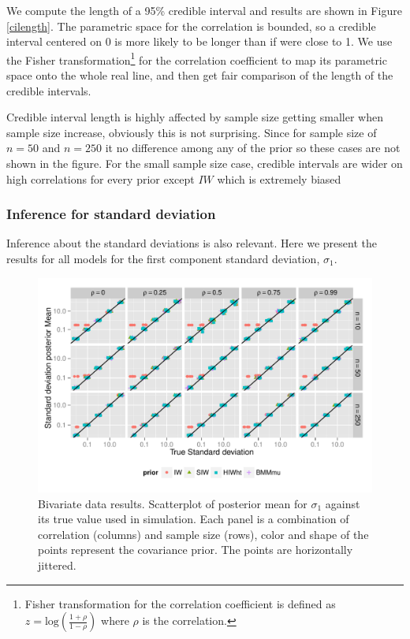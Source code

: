 \documentclass[a4paper]{article}
\newcommand{\matt}[1]{\textcolor{red}{(matt: #1)}}
\begin{document}
We compute the length of a 95\% credible interval and results are shown in Figure \ref{cilength}. The parametric space for the correlation is bounded, so a credible interval centered on 0 is more likely to be longer than if were close to 1. We use the Fisher transformation\footnote{ Fisher transformation for the correlation coefficient is defined as $z = \mbox{log} \left( \frac{1 + \rho}{1 - \rho} \right)$ where $\rho$ is the correlation. } for the correlation coefficient to map its parametric space onto the whole real line, and then get fair comparison of the length of the credible intervals.

Credible interval length is highly affected by sample size getting smaller when sample size increase, obviously this is not surprising.  Since for sample size of $n=50$ and $n=250$ it no difference among any of the prior so these cases are not shown in the figure. For the small sample size case, credible intervals are wider on high correlations for every prior except $IW$ which is extremely biased

\subsubsection{Inference for standard deviation}
Inference about the standard deviations is also relevant. Here we present the results for all models for the first component standard deviation, $\sigma_1$. 
\begin{figure}[htbp]
   \centering
   \includegraphics[width=\textwidth]{fig_s1_d2} 
    \vspace{-.5in}
   \caption{Bivariate data results. Scatterplot of posterior mean for $\sigma_1$  against its true value used in simulation. Each panel is a combination of correlation (columns) and sample size (rows),  color and shape of the points represent the covariance prior. The points are horizontally jittered. \label{devF1} %
}
\end{figure}
\end{document}
